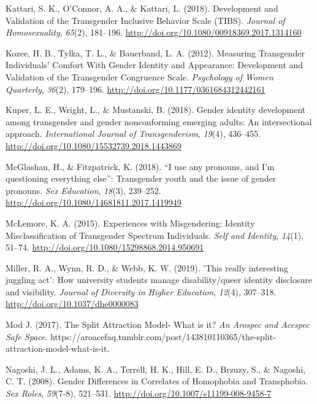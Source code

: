 \documentclass[12pt,twoside]{reedthesis}
\newlength{\cslhangindent}
\newenvironment{cslreferences}%
  {\setlength{\parindent}{0pt}%
  \everypar{\setlength{\hangindent}{\cslhangindent}}\ignorespaces}%
  {\par}
\begin{document}
\begin{cslreferences}
\leavevmode\hypertarget{ref-kattariDevelopmentValidationTransgender2018}{}%
Kattari, S. K., O'Connor, A. A., \& Kattari, L. (2018). Development and Validation of the Transgender Inclusive Behavior Scale (TIBS). \emph{Journal of Homosexuality}, \emph{65}(2), 181--196. \url{http://doi.org/10.1080/00918369.2017.1314160}

\leavevmode\hypertarget{ref-kozeeMeasuringTransgenderIndividuals2012}{}%
Kozee, H. B., Tylka, T. L., \& Bauerband, L. A. (2012). Measuring Transgender Individuals' Comfort With Gender Identity and Appearance: Development and Validation of the Transgender Congruence Scale. \emph{Psychology of Women Quarterly}, \emph{36}(2), 179--196. \url{http://doi.org/10.1177/0361684312442161}

\leavevmode\hypertarget{ref-kuperGenderIdentityDevelopment2018}{}%
Kuper, L. E., Wright, L., \& Mustanski, B. (2018). Gender identity development among transgender and gender nonconforming emerging adults: An intersectional approach. \emph{International Journal of Transgenderism}, \emph{19}(4), 436--455. \url{http://doi.org/10.1080/15532739.2018.1443869}

\leavevmode\hypertarget{ref-mcglashanUseAnyPronouns2018}{}%
McGlashan, H., \& Fitzpatrick, K. (2018). ``I use any pronouns, and I'm questioning everything else'': Transgender youth and the issue of gender pronouns. \emph{Sex Education}, \emph{18}(3), 239--252. \url{http://doi.org/10.1080/14681811.2017.1419949}

\leavevmode\hypertarget{ref-mclemoreExperiencesMisgenderingIdentity2015}{}%
McLemore, K. A. (2015). Experiences with Misgendering: Identity Misclassification of Transgender Spectrum Individuals. \emph{Self and Identity}, \emph{14}(1), 51--74. \url{http://doi.org/10.1080/15298868.2014.950691}

\leavevmode\hypertarget{ref-millerThisReallyInteresting2019}{}%
Miller, R. A., Wynn, R. D., \& Webb, K. W. (2019). 'This really interesting juggling act': How university students manage disability/queer identity disclosure and visibility. \emph{Journal of Diversity in Higher Education}, \emph{12}(4), 307--318. \url{http://doi.org/10.1037/dhe0000083}

\leavevmode\hypertarget{ref-modjSplitAttractionModel2017}{}%
Mod J. (2017). The Split Attraction Model- What is it? \emph{An Arospec and Acespec Safe Space}. https://aroacefaq.tumblr.com/post/143810110365/the-split-attraction-model-what-is-it.

\leavevmode\hypertarget{ref-nagoshiGenderDifferencesCorrelates2008}{}%
Nagoshi, J. L., Adams, K. A., Terrell, H. K., Hill, E. D., Brzuzy, S., \& Nagoshi, C. T. (2008). Gender Differences in Correlates of Homophobia and Transphobia. \emph{Sex Roles}, \emph{59}(7-8), 521--531. \url{http://doi.org/10.1007/s11199-008-9458-7}


\end{cslreferences}
\end{document}
